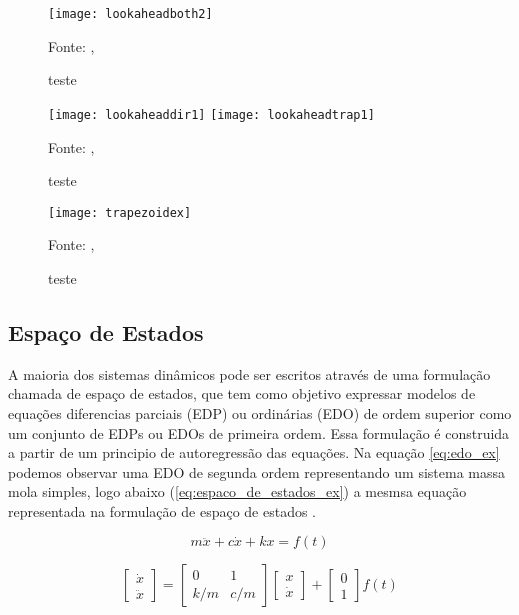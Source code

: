 \begin{figure}[!htb]
    \centering
    \caption{teste}
    \texttt{[image: lookaheadboth2]}

    {\footnotesize Fonte: \citeauthor{klipperkinematic}, \citeyear{klipperkinematic}}
    \label{fig:label9}
\end{figure}

\begin{figure}[!htb]
    \centering
    \caption{teste}
    \texttt{[image: lookaheaddir1]}
    \texttt{[image: lookaheadtrap1]}

    {\footnotesize Fonte: \citeauthor{klipperkinematic}, \citeyear{klipperkinematic}}
    \label{fig:label9}
\end{figure}


\begin{figure}[!htb]
    \centering
    \caption{teste}
    \texttt{[image: trapezoidex]}

    {\footnotesize Fonte: \citeauthor{klipperkinematic}, \citeyear{klipperkinematic}}
    \label{fig:label9}
\end{figure}


\subsection{Espaço de Estados}

A maioria dos sistemas dinâmicos pode ser escritos através de uma formulação
chamada de espaço de estados, que tem como objetivo expressar modelos 
de equações diferencias parciais (EDP) ou ordinárias (EDO) de ordem superior
como um conjunto de EDPs ou EDOs de primeira ordem.
Essa formulação é construida a partir de um principio de autoregressão
das equações. Na equação \ref{eq:edo_ex} podemos observar uma EDO de segunda ordem representando
um sistema massa mola simples,
logo abaixo (\ref{eq:espaco_de_estados_ex}) a mesmsa equação representada na formulação
de espaço de estados \cite{hamilton94}.

\begin{equation}
    \label{eq:edo_ex}
    m \ddot x+c \dot x+kx = f(t)
\end{equation}

\begin{equation}
    \label{eq:espaco_de_estados_ex}
    \begin{bmatrix}
        \dot x \\
        \ddot x
    \end{bmatrix}
    =
    \begin{bmatrix}
        0 & 1 \\
        k/m & c/m
    \end{bmatrix}
    \begin{bmatrix}
        x \\
        \dot x
    \end{bmatrix}
    +
    \begin{bmatrix}
        0 \\
        1
    \end{bmatrix}
    f(t)
\end{equation}

